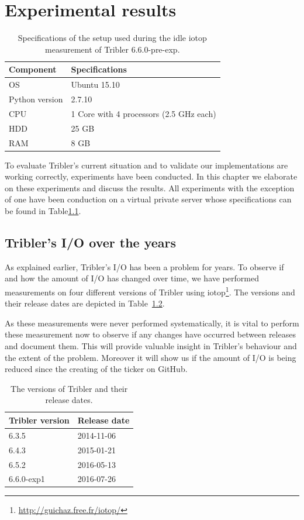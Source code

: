 \chapter{Experimental results}
\label{cpt:experiments}

\begin{table}[h]
	\centering
	\begin{tabular}{l|l}
		\textbf{Component} 	& \textbf{Specifications} \\ \hline
		OS   				& Ubuntu 15.10 \\
		Python version		& 2.7.10 \\
		CPU					& 1 Core with 4 processors (2.5 GHz each) \\ 
		HDD					& 25 GB  \\ 
		RAM					& 8 GB  \\
	\end{tabular}
	\caption{Specifications of the setup used during the idle iotop measurement of Tribler 6.6.0-pre-exp.}
	\label{table:virtual_machine_specs}
\end{table}

To evaluate Tribler's current situation and to validate our implementations are working correctly, experiments have been conducted.
In this chapter we elaborate on these experiments and discuss the results. 
All experiments with the exception of one have been conduction on a virtual private server whose specifications can be found in Table\ref{table:virtual_machine_specs}.

\section{Tribler's I/O over the years}
As explained earlier, Tribler's I/O has been a problem for years.
To observe if and how the amount of I/O has changed over time, we have performed measurements on four  different versions of Tribler using iotop\footnote{\url{http://guichaz.free.fr/iotop/}}.
The versions and their release dates are depicted in Table~\ref{table:tribler_version_dates}.

As these measurements were never performed systematically, it is vital to perform these measurement now to observe if any changes have occurred between releases and document them.
This will provide valuable insight in Tribler's behaviour and the extent of the problem.
Moreover it will show us if the amount of I/O is being reduced since the creating of the ticker on GitHub.

\begin{table}[h]
	\centering
	\caption{The versions of Tribler and their release dates.}
	\label{table:tribler_version_dates}
	\begin{tabular}{|l|l|}
		\hline
		Tribler version & Release date \\ \hline
		6.3.5           & 2014-11-06   \\ \hline
		6.4.3           & 2015-01-21   \\ \hline
		6.5.2           & 2016-05-13   \\ \hline
		6.6.0-exp1      & 2016-07-26   \\ \hline
	\end{tabular}
\end{table}

